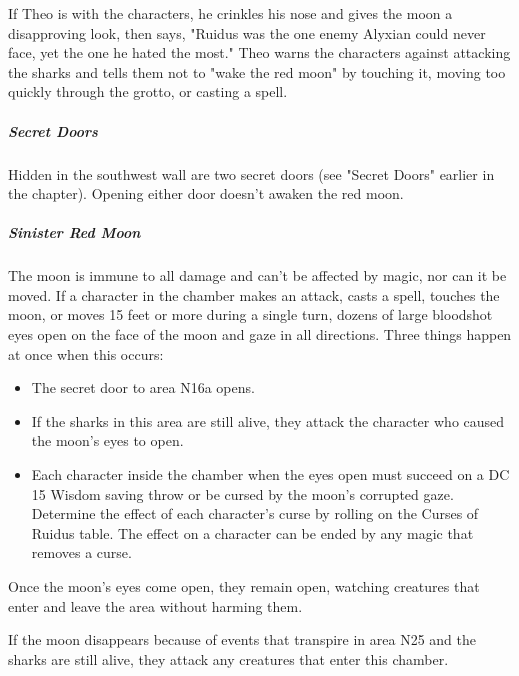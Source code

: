 \documentclass[10pt,a4paper,twoside,bg=print,twocolumn,openany,nodeprecatedcode]{dndbook}
\begin{document}
If Theo is with the characters, he crinkles his nose and gives the moon a disapproving look, then says, "Ruidus was the one enemy Alyxian could never face, yet the one he hated the most." Theo warns the characters against attacking the sharks and tells them not to "wake the red moon" by touching it, moving too quickly through the grotto, or casting a spell.

\subparagraph{Secret Doors}
Hidden in the southwest wall are two secret doors (see "Secret Doors" earlier in the chapter). Opening either door doesn't awaken the red moon.

\subparagraph{Sinister Red Moon}
The moon is immune to all damage and can't be affected by magic, nor can it be moved. If a character in the chamber makes an attack, casts a spell, touches the moon, or moves 15 feet or more during a single turn, dozens of large bloodshot eyes open on the face of the moon and gaze in all directions. Three things happen at once when this occurs:


\begin{itemize}
\item The secret door to area N16a opens.
\item If the sharks in this area are still alive, they attack the character who caused the moon's eyes to open.
\item Each character inside the chamber when the eyes open must succeed on a DC 15 Wisdom saving throw or be cursed by the moon's corrupted gaze. Determine the effect of each character's curse by rolling on the Curses of Ruidus table. The effect on a character can be ended by any magic that removes a curse.
\end{itemize}

Once the moon's eyes come open, they remain open, watching creatures that enter and leave the area without harming them.

If the moon disappears because of events that transpire in area N25 and the sharks are still alive, they attack any creatures that enter this chamber.
\end{document}
